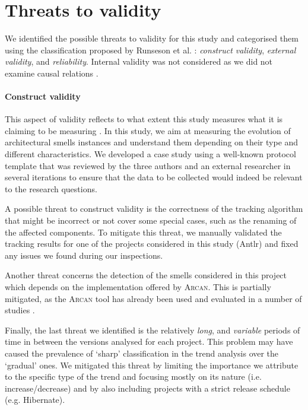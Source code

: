 
\section{Threats to validity}\label{c2:sec:threats}
We identified the possible threats to validity for this study and categorised them using the classification proposed by Runseson et al. \cite{Runeson2012}: \emph{construct validity}, \emph{external validity}, and \emph{reliability}.
Internal validity was not considered as we did not examine causal relations \cite{Runeson2012}.

\paragraph{Construct validity}
This aspect of validity reflects to what extent this study measures what it is claiming to be measuring \cite{Runeson2012}.
In this study, we aim at measuring the evolution of architectural smells instances and understand them depending on their type and different characteristics.
We developed a case study using a well-known protocol template \cite{Brereton2008} that was reviewed by the three authors and an external researcher in several iterations to ensure that the data to be collected would indeed be relevant to the research questions.

A possible threat to construct validity  is the correctness of the tracking algorithm that might be incorrect or not cover some special cases, such as the renaming of the affected components.
To mitigate this threat, we manually validated the tracking results for one of the projects considered in this study (Antlr) and fixed any issues we found during our inspections.

Another threat concerns the detection of the smells considered in this project which depends on the implementation offered by \textsc{Arcan}. This is partially mitigated, as the \textsc{Arcan} tool has already been used and evaluated in a number of studies \cite{Arcelli2016, Biaggi2018}.

Finally, the last threat we identified is the relatively \emph{long}, and \emph{variable} periods of time in between the versions analysed for each project. This problem may have caused the prevalence of `sharp' classification in the trend analysis over the `gradual' ones.
We mitigated this threat by limiting the importance we attribute to the specific type of the trend and focusing mostly on its nature (i.e. increase/decrease) and by also including projects with a strict release schedule (e.g. Hibernate).

